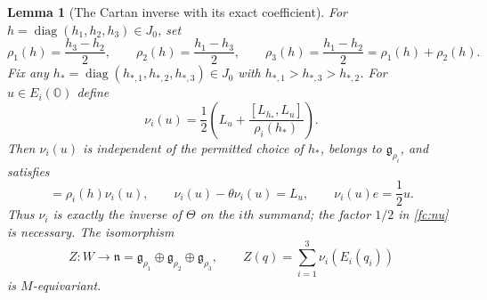 \documentclass[11pt]{article}
\newtheorem{lemma}[theorem]{Lemma}
\theoremstyle{definition}
\begin{document}
\begin{lemma}[The Cartan inverse with its exact coefficient]
\label{fc:cartan-inverse}
For $h=\operatorname{diag}(h_1,h_2,h_3)\in J_0$, set
\[
 \rho_1(h)=\frac{h_3-h_2}{2},\qquad
 \rho_2(h)=\frac{h_1-h_3}{2},\qquad
 \rho_3(h)=\frac{h_1-h_2}{2}=\rho_1(h)+\rho_2(h).
\]
Fix any
$h_*=\operatorname{diag}(h_{*,1},h_{*,2},h_{*,3})\in J_0$
with $h_{*,1}>h_{*,3}>h_{*,2}$. For $u\in E_i(\mathbb O)$ define
\begin{equation}
 \nu_i(u)=\frac12\left(L_u+
             \frac{[L_{h_*},L_u]}{\rho_i(h_*)}\right).
 \label{fc:nu}
\end{equation}
Then $\nu_i(u)$ is independent of the permitted choice of $h_*$,
belongs to $\mathfrak g_{\rho_i}$, and satisfies
\begin{equation}
 [L_h,\nu_i(u)]=\rho_i(h)\nu_i(u),\qquad
 \nu_i(u)-\theta\nu_i(u)=L_u,\qquad
 \nu_i(u)e=\frac12u.
 \label{fc:nu-identities}
\end{equation}
Thus $\nu_i$ is exactly the inverse of $\Theta$ on the $i$th summand;
the factor $1/2$ in \eqref{fc:nu} is necessary.
The isomorphism
\[
 Z:W\longrightarrow\mathfrak n
       =\mathfrak g_{\rho_1}\oplus\mathfrak g_{\rho_2}
                               \oplus\mathfrak g_{\rho_3},\qquad
 Z(q)=\sum_{i=1}^3\nu_i(E_i(q_i))
\]
is $M$-equivariant.
\end{lemma}
\end{document}
